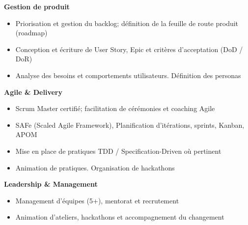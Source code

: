 \documentclass[11pt,a4paper]{article}
\newcommand{\skilltitle}[1]{\normalsize\textcolor{primaryblue}{\textbf{#1}}}
\begin{document}
\begin{minipage}[t]{0.55\textwidth}
\skilltitle{Gestion de produit}
\begin{itemize}[leftmargin=10pt]
    \item Priorisation et gestion du backlog; définition de la feuille de route produit (roadmap)
    \item Conception et écriture de User Story, Epic et critères d'acceptation (DoD / DoR)
    \item Analyse des besoins et comportements utilisateurs. Définition des personas
\end{itemize}

\skilltitle{Agile \& Delivery}
\begin{itemize}[leftmargin=10pt]
    \item Scrum Master certifié; facilitation de cérémonies et coaching Agile
    \item SAFe (Scaled Agile Framework), Planification d'itérations, sprints, Kanban, APOM
    \item Mise en place de pratiques TDD / Specification-Driven où pertinent
    \item Animation de pratiques. Organisation de hackathons
\end{itemize}

\skilltitle{Leadership \& Management}
\begin{itemize}[leftmargin=10pt]
    \item Management d'équipes (5+), mentorat et recrutement
    \item Animation d'ateliers, hackathons et accompagnement du changement
\end{itemize}
\end{minipage}
\hfill
\end{document}
